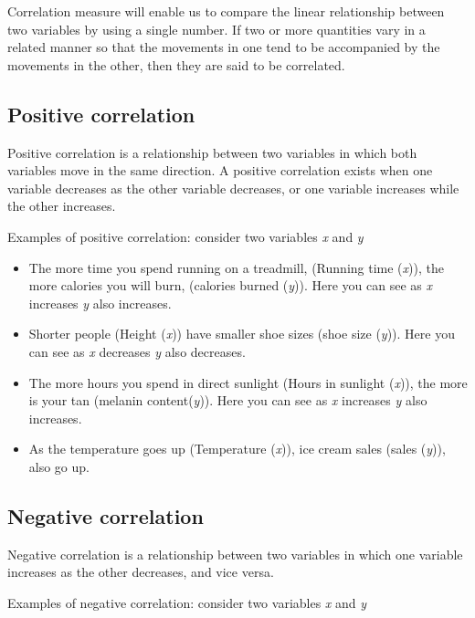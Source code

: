 \documentclass[
]{book}
\begin{document}
Correlation measure will enable us to compare the linear relationship
between two variables by using a single number. If two or more
quantities vary in a related manner so that the movements in one tend to
be accompanied by the movements in the other, then they are said to be
correlated.

\subsection{Positive correlation}\label{positive-correlation}

Positive correlation is a relationship between two variables in which
both variables move in the same direction. A positive correlation exists
when one variable decreases as the other variable decreases, or one
variable increases while the other increases.

Examples of positive correlation: consider two variables \emph{x} and \emph{y}

\begin{itemize}
\item
  The more time you spend running on a treadmill, (Running time
  (\emph{x})), the more calories you will burn, (calories burned (\emph{y})).
  Here you can see as \emph{x} increases \emph{y} also increases.
\item
  Shorter people (Height (\emph{x})) have smaller shoe sizes (shoe size
  (\emph{y})). Here you can see as \emph{x} decreases \emph{y} also decreases.
\item
  The more hours you spend in direct sunlight (Hours in sunlight
  (\emph{x})), the more is your tan (melanin content(\emph{y})). Here you can
  see as \emph{x} increases \emph{y} also increases.
\item
  As the temperature goes up (Temperature (\emph{x})), ice cream sales
  (sales (\emph{y})), also go up.
\end{itemize}

\subsection{Negative correlation}\label{negative-correlation}

Negative correlation is a relationship between two variables in which
one variable increases as the other decreases, and vice versa.

Examples of negative correlation: consider two variables \emph{x} and \emph{y}
\end{document}

